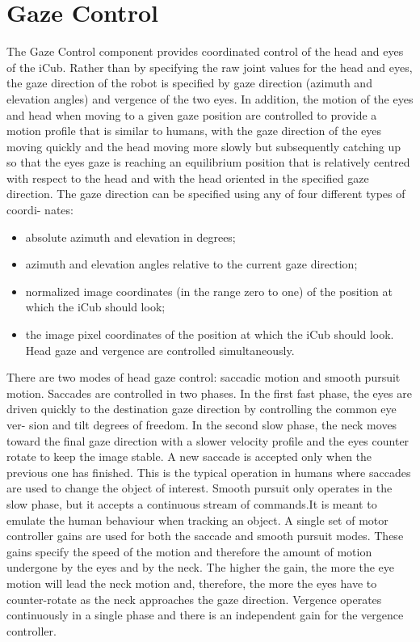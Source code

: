 \documentclass[a4paper, 11pt]{report}
\begin{document}
\section{Gaze Control}
The Gaze Control component provides coordinated control of the head and eyes of 
the iCub. Rather than by specifying the raw joint values for the head and eyes, 
the gaze direction of the robot is specified by gaze direction (azimuth and 
elevation angles) and vergence of the two eyes. In addition, the motion of the 
eyes and head when moving to a given gaze position are controlled to provide a 
motion profile that is similar to humans, with the gaze direction of the eyes 
moving quickly and the head moving more slowly but subsequently catching up so 
that the eyes gaze is reaching an equilibrium position that is relatively 
centred with respect to the head  and with the head oriented in the specified 
gaze direction.
The gaze direction can be specified using any of four different types of 
coordi- nates:
\begin{itemize}
  \item absolute azimuth and elevation  in degrees;
  \item azimuth and elevation angles relative to the current gaze direction;
  \item normalized image coordinates (in the range zero to one) of the position 
  at which the iCub should look;
  \item the image pixel coordinates of the position at which the iCub should 
  look.  Head gaze and vergence are controlled simultaneously.
\end{itemize}
There are two modes of head gaze control: saccadic motion and smooth pursuit
motion. Saccades are controlled in two phases. In the first fast phase, the 
eyes are driven quickly to the destination gaze direction by controlling the 
common eye ver- sion and tilt degrees of freedom. In the second slow phase, the 
neck moves toward the final gaze direction with a slower velocity profile and 
the eyes counter rotate to keep the image stable. A new saccade is accepted 
only when the previous one has finished. This is the typical operation in 
humans where saccades are used to change the object of interest. Smooth 
pursuit only operates in the slow phase, but it accepts a continuous stream 
of commands.\cite{1}It is meant to emulate the human behaviour when 
tracking an 
object. A single set of motor controller gains are used for both the saccade 
and smooth pursuit modes. These gains specify the speed of the motion and 
therefore the amount of motion undergone by the eyes and by the neck. The 
higher the gain, the more the eye motion will lead the neck motion and, 
therefore, the more the eyes have to counter-rotate as the neck approaches the 
gaze direction. Vergence operates continuously in a single phase and there is 
an independent gain for the vergence controller.
\end{document}
